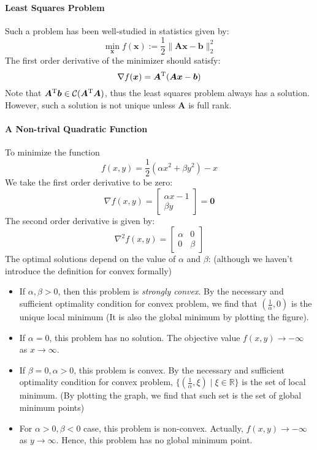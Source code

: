 \paragraph{Least Squares Problem} Such a problem has been well-studied in statistics given by:
\[
\min_{\bm x}f(\bm x):=\frac{1}{2}\|\bm{Ax}-\bm b\|_2^2
\]
The first order derivative of the minimizer should satisfy:
\[
\nabla f(\bm x)=\bm A^{\mathrm T}(\bm A\bm x-\bm b)
\]
Note that $\bm A^{\mathrm T}\bm b\in\mathcal{C}(\bm A^{\mathrm T}\bm A)$, thus the least squares problem always has a solution. However, such a solution is not unique unless $\bm A$ is full rank.
\paragraph{A Non-trival Quadratic Function}
To minimize the function
\[
f(x,y)=\frac{1}{2}(\alpha x^2+\beta y^2)-x
\] 
We take the first order derivative to be zero:
\[
\nabla f(x,y)=\begin{bmatrix}
\alpha x-1\\\beta y
\end{bmatrix}=\bm0
\]
The second order derivative is given by:
\[
\nabla^2 f(x,y)=\begin{bmatrix}
\alpha&0\\0&\beta
\end{bmatrix}
\]
The optimal solutions depend on the value of $\alpha$ and $\beta$: (although we haven't introduce the definition for convex formally)
\begin{itemize}
\item
If $\alpha,\beta>0$, then this problem is \emph{strongly convex}. By the necessary and sufficient optimality condition for convex problem, we find that $(\frac{1}{\alpha},0)$ is the unique local minimum (It is also the global minimum by plotting the figure).
\item
If $\alpha=0$, this problem has no solution. The objective value $f(x,y)\to-\infty$ as $x\to
\infty$.
\item
If $\beta=0,\alpha>0$, this problem is convex.  By the necessary and sufficient optimality condition for convex problem, $\{(\frac{1}{\alpha},\xi)\mid \xi\in\mathbb{R}\}$ is the set of local minimum. (By plotting the graph, we find that such set is the set of global minimum points)
\item
For $\alpha>0,\beta<0$ case, this problem is non-convex. Actually, $f(x,y)\to-\infty$ as $y\to
\infty$. Hence, this problem has no global minimum point.
\end{itemize}

